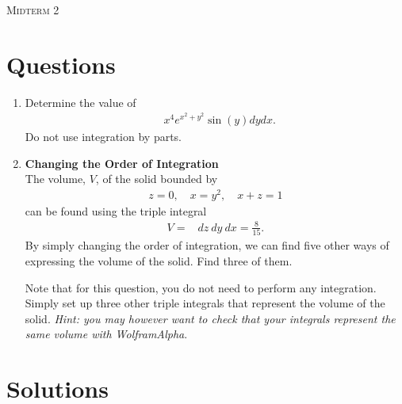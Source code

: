 \documentclass{article}
\date{}
\begin{document}
\begin{center}
\textsc{\LARGE Midterm 2}\\[0.5cm]
\end{center}
\section*{Questions}

\begin{enumerate}
\item %
Determine the value of
\begin{align*}
  \mathop{\int_0^{\pi} \!\! \int_{-1}^1} x^4e^{x^2 + y^2}\sin(y) dydx.
\end{align*}
Do not use integration by parts.


\item %
\textbf{Changing the Order of Integration}\\
The volume, $V$, of the solid bounded by
\begin{align*}
  z=0, \quad x=y^2, \quad x+z=1
\end{align*}
can be found using the triple integral 
\begin{align*}
  V = \mathop{\int_{0}^{1} \!\! \int_{-\sqrt{x}}^{\sqrt{x}} \! \int_0^{1-x} } dz\ dy\ dx = \frac{8}{15}.
\end{align*}
By simply changing the order of integration, we can find five other ways of expressing the volume of the solid. Find three of them. 

Note that for this question, you do not need to perform any integration. Simply set up three other triple integrals that represent the volume of the solid.
\textit{Hint: you may however want to check that your integrals represent the same volume with WolframAlpha}.

\end{enumerate} %

\newpage
\section*{Solutions}
\end{document}
